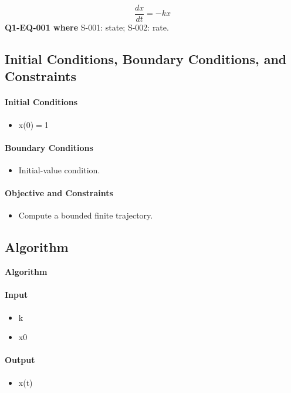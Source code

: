 \documentclass[11pt]{article}
\begin{document}
\begin{equation}\label{eq:Q1-EQ-001}
\frac{dx}{dt}=-kx
\end{equation}
\noindent\textbf{Q1-EQ-001 where} S-001: state; S-002: rate.

\subsection{Initial Conditions, Boundary Conditions, and Constraints}

\paragraph{Initial Conditions}
\begin{itemize}
\item x(0)\ensuremath{=}1
\end{itemize}

\paragraph{Boundary Conditions}
\begin{itemize}
\item Initial-value condition.
\end{itemize}

\paragraph{Objective and Constraints}
\begin{itemize}
\item Compute a bounded finite trajectory.
\end{itemize}

\subsection{Algorithm}

\noindent\textbf{Algorithm}
\paragraph{Input}
\begin{itemize}
\item k
\item x0
\end{itemize}
\paragraph{Output}
\begin{itemize}
\item x(t)
\end{itemize}
\end{document}

